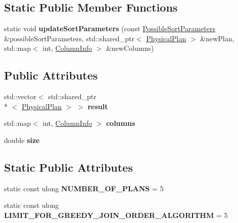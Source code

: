 \subsection*{Static Public Member Functions}
\begin{DoxyCompactItemize}
\item 
\hypertarget{class_algebra_compiler_a64b17061a41e21787cb35572b60d826d}{static void {\bfseries update\+Sort\+Parameters} (const \hyperlink{class_possible_sort_parameters}{Possible\+Sort\+Parameters} \&possible\+Sort\+Parameters, std\+::shared\+\_\+ptr$<$ \hyperlink{class_physical_plan}{Physical\+Plan} $>$ \&new\+Plan, std\+::map$<$ int, \hyperlink{class_column_info}{Column\+Info} $>$ \&new\+Columns)}\label{class_algebra_compiler_a64b17061a41e21787cb35572b60d826d}

\end{DoxyCompactItemize}
\subsection*{Public Attributes}
\begin{DoxyCompactItemize}
\item 
\hypertarget{class_algebra_compiler_acf3202bd193e4552a1d4fadb6d0b356c}{std\+::vector$<$ std\+::shared\+\_\+ptr\\*
$<$ \hyperlink{class_physical_plan}{Physical\+Plan} $>$ $>$ {\bfseries result}}\label{class_algebra_compiler_acf3202bd193e4552a1d4fadb6d0b356c}

\item 
\hypertarget{class_algebra_compiler_a33ca2507927649bb0176c00ea5944d21}{std\+::map$<$ int, \hyperlink{class_column_info}{Column\+Info} $>$ {\bfseries columns}}\label{class_algebra_compiler_a33ca2507927649bb0176c00ea5944d21}

\item 
\hypertarget{class_algebra_compiler_adcc3f8ba764b873c170cfb28d4636b16}{double {\bfseries size}}\label{class_algebra_compiler_adcc3f8ba764b873c170cfb28d4636b16}

\end{DoxyCompactItemize}
\subsection*{Static Public Attributes}
\begin{DoxyCompactItemize}
\item 
\hypertarget{class_algebra_compiler_ab1a348c2daa3ca8f805f7cec2b35e29d}{static const ulong {\bfseries N\+U\+M\+B\+E\+R\+\_\+\+O\+F\+\_\+\+P\+L\+A\+N\+S} = 5}\label{class_algebra_compiler_ab1a348c2daa3ca8f805f7cec2b35e29d}

\item 
\hypertarget{class_algebra_compiler_a75bdf7e239082b0a6c8560ac5a75e72a}{static const ulong {\bfseries L\+I\+M\+I\+T\+\_\+\+F\+O\+R\+\_\+\+G\+R\+E\+E\+D\+Y\+\_\+\+J\+O\+I\+N\+\_\+\+O\+R\+D\+E\+R\+\_\+\+A\+L\+G\+O\+R\+I\+T\+H\+M} = 5}\label{class_algebra_compiler_a75bdf7e239082b0a6c8560ac5a75e72a}

\end{DoxyCompactItemize}


